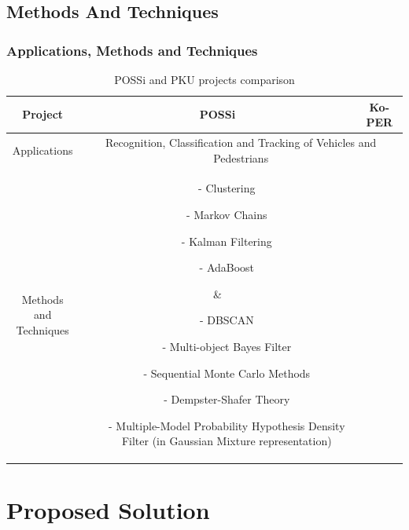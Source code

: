 \documentclass[table]{beamer}
\begin{document}
\subsection{Methods And Techniques}
\frame
{
	\frametitle{Applications, Methods and Techniques}
	
	\scriptsize{
	\begin{table}	
	\begin{tabular}{|c|c|c|}
	\hline
	Project & POSSi & Ko-PER \\
	\hline
	Applications & \multicolumn{2}{c|}{\parbox{6cm}{Recognition, Classification and Tracking of Vehicles and Pedestrians}} \\
	\hline
	\parbox{2.5cm}{Methods and \\Techniques}
	& \parbox{2.5cm}{\begin{itemize}[leftmargin=.07in]
		\item[-] Clustering
		\item[-] Markov Chains
		\item[-] Kalman Filtering
		\item[-] AdaBoost
	\end{itemize}
	}
	& \parbox{3.5cm}{
	\begin{itemize}[leftmargin=.07in]
		\item[-] DBSCAN
		\item[-] Multi-object Bayes Filter
		\item[-] Sequential Monte Carlo Methods
		\item[-] Dempster-Shafer Theory
		\item[-] Multiple-Model Probability Hypothesis Density Filter (in Gaussian Mixture representation)
	\end{itemize}
	}\\
	\hline
	
	\end{tabular}
	\caption{POSSi and PKU projects comparison}	
	\end{table}
	}
}
\section{Proposed Solution}
\end{document}
